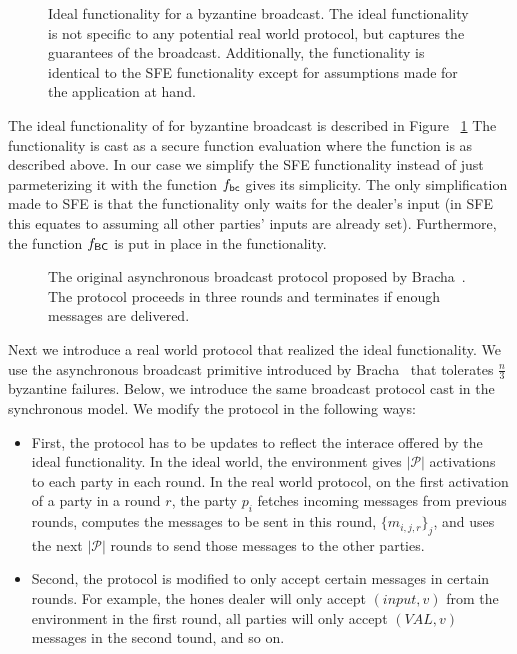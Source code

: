 \begin{figure}[!h]
	
	\label{fig:functionality:broadcast}
	\caption{Ideal functionality for a byzantine broadcast. The ideal functionality is not specific to any potential real world protocol, but captures the guarantees of the broadcast. Additionally, the functionality is identical to the SFE functionality except for assumptions made for the application at hand.}
\end{figure}

The ideal functionality of for byzantine broadcast is described in Figure ~\ref{fig:functionality:broadcast}
The functionality is cast as a secure function evaluation where the function is as described above.
In our case we simplify the SFE functionality instead of just parmeterizing it with the function $f_{{\mathsf {bc}}}$ gives its simplicity.
The only simplification made to SFE is that the functionality only waits for the dealer's input (in SFE this equates to assuming all other parties' inputs are already set).
Furthermore, the function $f_{{\mathsf {BC}}}$ is put in place in the functionality.

\begin{figure}
	
	\label{fig:protocol:asyncbracha}
	\caption{The original asynchronous broadcast protocol proposed by Bracha~\cite{bracha-broadcast}. The protocol proceeds in three rounds and terminates if enough messages are delivered.}
\end{figure}

Next we introduce a real world protocol that realized the ideal functionality.
We use the asynchronous broadcast primitive introduced by Bracha~\cite{bracha-broadcast} that tolerates $\frac{n}{3}$ byzantine failures.
Below, we introduce the same broadcast protocol cast in the synchronous model.
We modify the protocol in the following ways:

\begin{itemize}
	\item First, the protocol has to be updates to reflect the interace offered by the ideal functionality. In the ideal world, the environment gives $|\mathcal{P}|$ activations to each party in each round. In the real world protocol, on the first activation of a party in a round $r$, the party $p_i$ fetches incoming messages from previous rounds, computes the messages to be sent in this round, $\{m_{i,j,r}\}_{j}$, and uses the next $|\mathcal{P}|$ rounds to send those messages to the other parties.
	\item Second, the protocol is modified to only accept certain messages in certain rounds. For example, the hones dealer will only accept $(input,v)$ from the environment in the first round, all parties will only accept $(VAL,v)$ messages in the second tound, and so on.
\end{itemize}

